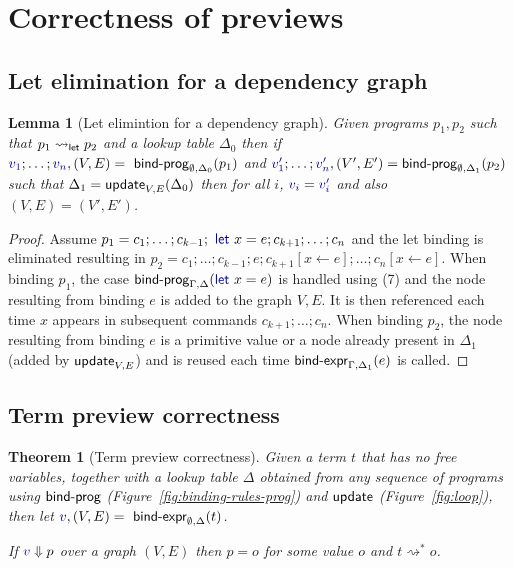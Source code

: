 \documentclass[english,submission]{programming}
\newcounter{thc}
\theoremstyle{plain}
\newtheorem{lem}[thc]{Lemma}
\newtheorem{theorem}[thc]{Theorem}
\theoremstyle{definition}
\newcommand{\ident}[1]{\textnormal{\textcolor{idclr}{\sffamily #1}}}
\newcommand{\kvd}[1]{\textnormal{\textcolor{kvdclr}{\sffamily #1}}}
\newcommand{\bndclr}[1]{\textcolor{kvdclr}{#1}}
\begin{document}
\section{Correctness of previews}
\label{sec:app-correctness}

\subsection{Let elimination for a dependency graph}
\label{sec:app-let-grp-elimination}

\begin{lem}[Let elimintion for a dependency graph]
\label{thm:app-let-grp-elimination}
Given programs $p_1, p_2$ such that $p_1 \rightsquigarrow_\ident{let} p_2$ and a lookup table
$\Delta_0$ then if $\bndclr{v_1}; \ldots; \bndclr{v_n}, (V, E) = \ident{bind-prog}_{\emptyset, \Delta_0}(p_1)$ and
$\bndclr{v'_1};\ldots;\bndclr{v'_n}, (V', E') = \ident{bind-prog}_{\emptyset, \Delta_1}(p_2)$ such that $\Delta_1 = \ident{update}_{V, E}(\Delta_0)$
then for all $i$, $\bndclr{v_i} = \bndclr{v'_i}$ and also $(V, E) = (V', E')$.
\end{lem}
\begin{proof}
Assume $p_1 = c_1; \ldots; c_{k-1}; \kvd{let}~x=e; c_{k+1};\ldots; c_n$ and the let binding is
eliminated resulting in $p_2 = c_1; \ldots; c_{k-1}; e; c_{k+1}[x\leftarrow e];\ldots; c_n[x\leftarrow e]$.
When binding $p_1$, the case $\ident{bind-prog}_{\Gamma,\Delta}(\kvd{let}~x=e)$ is handled using (7)
and the node resulting from binding $e$ is added to the graph $V, E$. It is then referenced each
time $x$ appears in subsequent commands $c_{k+1}; \ldots; c_n$.
When binding $p_2$, the node resulting from binding $e$ is a primitive value or a node already
present in $\Delta_1$ (added by $\ident{update}_{V, E}$) and is reused each time
$\ident{bind-expr}_{\Gamma,\Delta_1}(e)$ is called.
\end{proof}

\subsection{Term preview correctness}
\label{sec:app-let-free-correct}

\begin{theorem}[Term preview correctness]
\label{thm:app-let-free-correct}
Given a term $t$ that has no free variables, together with a lookup table $\Delta$ obtained
from any sequence of programs using $\ident{bind-prog}$ (Figure~\ref{fig:binding-rules-prog}) and
$\ident{update}$ (Figure~\ref{fig:loop}), then
let $\bndclr{v}, (V, E) = \ident{bind-expr}_{\emptyset, \Delta}(t)$.

\vspace{0.25em}
\noindent
If $\bndclr{v}\Downarrow p$
over a graph $(V, E)$ then $p = o$ for some value $o$ and $t \rightsquigarrow^{*} o$.
\end{theorem}
\end{document}
